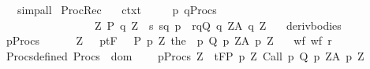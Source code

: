 \begin{isabellebody}
\ \ \ \ \ simp{\isacharunderscore}all{\isacharparenright}%
\endisatagproof
{\isafoldproof}%
%
\isadelimproof
\isanewline
%
\endisadelimproof
\isanewline
{}\isamarkupfalse%
\ ProcRec{\isacharprime}{\isacharcolon}\isanewline
\ \ \ ctxt{\isacharcolon}\ \isanewline
\ \ \ {\isachardoublequoteopen}{\isasymTheta}{\isacharprime}{\isacharequal}{\isacharparenleft}{\isasymlambda}{\isasymsigma}\ p{\isachardot}\ {\isasymTheta}{\isasymunion}{\isacharparenleft}{\isasymUnion}q{\isasymin}Procs{\isachardot}\ \isanewline
\ \ \ \ \ \ \ \ \ \ \ \ \ \ \ \ \ \ \ {\isasymUnion}Z{\isachardot}\ {\isacharbraceleft}{\isacharparenleft}P\ q\ Z\ {\isasyminter}\ {\isacharbraceleft}s{\isachardot}\ {\isacharparenleft}{\isacharparenleft}s{\isacharcomma}q{\isacharparenright}{\isacharcomma}\ {\isasymsigma}{\isacharcomma}p{\isacharparenright}\ {\isasymin}\ r{\isacharbraceright}{\isacharcomma}q{\isacharcomma}Q\ q\ Z{\isacharcomma}A\ q\ Z{\isacharparenright}{\isacharbraceright}{\isacharparenright}{\isacharparenright}{\isachardoublequoteclose}\isanewline
\ \ \ deriv{\isacharunderscore}bodies{\isacharcolon}\ \ \ \isanewline
\ \ \ {\isachardoublequoteopen}{\isasymforall}p{\isasymin}Procs{\isachardot}\ \isanewline
\ \ \ \ {\isasymforall}{\isasymsigma}\ Z{\isachardot}\ {\isasymGamma}{\isacharcomma}{\isasymTheta}{\isacharprime}\ {\isasymsigma}\ p{\isasymturnstile}\isactrlsub t\isactrlbsub {\isacharslash}F\isactrlesub \ {\isacharparenleft}{\isacharbraceleft}{\isasymsigma}{\isacharbraceright}\ {\isasyminter}\ P\ p\ Z{\isacharparenright}\ {\isacharparenleft}the\ {\isacharparenleft}{\isasymGamma}\ p{\isacharparenright}{\isacharparenright}\ {\isacharparenleft}Q\ p\ Z{\isacharparenright}{\isacharcomma}{\isacharparenleft}A\ p\ Z{\isacharparenright}{\isachardoublequoteclose}\isanewline
\ \ \ wf{\isacharcolon}\ {\isachardoublequoteopen}wf\ r{\isachardoublequoteclose}\isanewline
\ \ \ Procs{\isacharunderscore}defined{\isacharcolon}\ {\isachardoublequoteopen}Procs\ {\isasymsubseteq}\ dom\ {\isasymGamma}{\isachardoublequoteclose}\isanewline
\ \ \ {\isachardoublequoteopen}{\isasymforall}p{\isasymin}Procs{\isachardot}\ {\isasymforall}Z{\isachardot}\ \ {\isasymGamma}{\isacharcomma}{\isasymTheta}{\isasymturnstile}\isactrlsub t\isactrlbsub {\isacharslash}F\isactrlesub {\isacharparenleft}P\ p\ Z{\isacharparenright}\ Call\ p\ {\isacharparenleft}Q\ p\ Z{\isacharparenright}{\isacharcomma}{\isacharparenleft}A\ p\ Z{\isacharparenright}{\isachardoublequoteclose}\isanewline
%
\isadelimproof
\ \ %
\endisadelimproof

\end{isabellebody}
